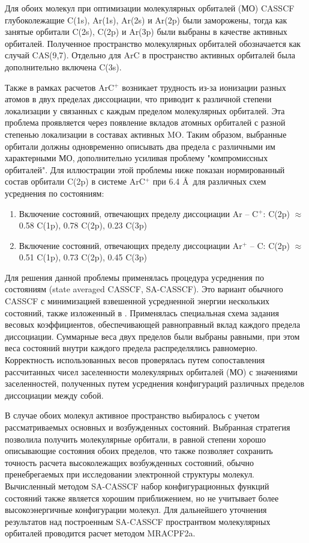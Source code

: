 \documentclass[12pt]{extarticle}
\begin{document}
	Для обоих молекул при оптимизации молекулярных орбиталей (МО) CASSCF глубоколежащие C(1s), Ar(1s), Ar(2s) и Ar(2p) были заморожены, тогда как занятые орбитали C(2s), C(2p) и Ar(3p) были выбраны в качестве активных орбиталей. Полученное пространство молекулярных орбиталей обозначается как случай CAS(9,7). Отдельно для ArC в пространство активных орбиталей была дополнительно включена C(3s).
	
	Также в рамках расчетов ArC$^+$ возникает трудность из-за ионизации разных атомов в двух пределах диссоциации, что приводит к различной степени локализации у связанных с каждым пределом молекулярных орбиталей. Эта проблема проявляется через появление вкладов атомных орбиталей с разной степенью локализации в составах активных MO. Таким образом, выбранные орбитали должны одновременно описывать два предела с различными им характерными МО, дополнительно усиливая проблему "компромиссных орбиталей". Для иллюстрации этой проблемы ниже показан нормированный состав орбитали C(2p) в системе ArC$^+$ при 6.4 \AA\ для различных схем усреднения по состояниям:
	
	\begin{enumerate}
		\item Включение состояний, отвечающих пределу диссоциации Ar -- C$^+$: C(2p) $\approx$ 0.58 C(1p), 0.78 C(2p), 0.23 C(3p)
		\item Включение состояний, отвечающих пределу диссоциации Ar$^+$ -- C: C(2p) $\approx$ 0.51 C(1p), 0.73 C(2p), 0.45 C(3p)
	\end{enumerate}
	
	Для решения данной проблемы применялась процедура усреднения по состояниям (state averaged CASSCF, SA-CASSCF). Это вариант обычного CASSCF с минимизацией взвешенной усредненной энергии нескольких состояний, также изложенный в \cite{casscf}. Применялась специальная схема задания весовых коэффициентов, обеспечивающей равноправный вклад каждого предела диссоциации. Суммарные веса двух пределов были выбраны равными, при этом веса состояний внутри каждого предела распределялись равномерно. Корректность использованных весов проверялась путем сопоставления рассчитанных чисел заселенности молекулярных орбиталей (МО) с значениями заселенностей, полученных путем усреднения конфигураций различных пределов диссоциации между собой.
	
	В случае обоих молекул активное пространство выбиралось с учетом рассматриваемых основных и возбужденных состояний. Выбранная стратегия позволила получить молекулярные орбитали, в равной степени хорошо описывающие состояния обоих пределов, что также позволяет сохранить точность расчета высоколежащих возбужденных состояний, обычно пренебрегаемых при исследовании электронной структуры молекул. Вычисленный методом SA-CASSCF набор конфигурационных функций состояний также является хорошим приближением, но не учитывает более высокоэнергичные конфигурации молекул. Для дальнейшего уточнения результатов над построенным SA-CASSCF пространтвом молекулярных орбиталей проводится расчет методом MRACPF2a.
	
\end{document}
